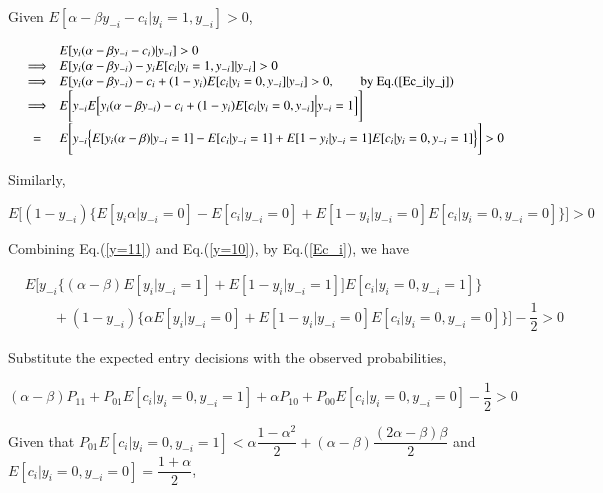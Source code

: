 \documentclass[a4paper]{article}
\begin{document}
Given $E[\alpha - \beta y_{-i} - c_i|y_i = 1, y_{-i}] > 0$, 

\begin{equation}
    \begin{array}{rcl}
        &&     E[y_i(\alpha - \beta y_{-i} - c_i)|y_{-i}] > 0 \\
        & \Longrightarrow & E[y_i(\alpha - \beta y_{-i}) - y_iE[c_i|y_i = 1, y_{-i}]|y_{-i}] > 0 \\
        & \Longrightarrow & E[y_i(\alpha - \beta y_{-i}) - c_i + (1 - y_i)E[c_i|y_i = 0, y_{-i}]|y_{-i}] > 0, \qquad \mbox{by Eq.(\ref{Ec_i|y_j})}\\
        & \Longrightarrow & E\Bigg[y_{-i}E\Big[y_i(\alpha - \beta y_{-i}) - c_i + (1 - y_i)E[c_i|y_i = 0, y_{-i}]\Big|y_{-i} = 1\Big]\Bigg] \\
        & = & E\Bigg[y_{-i}\Big\{E[y_i(\alpha - \beta)|y_{-i} = 1] - E[c_i|y_{-i} = 1] + E[1 - y_i|y_{-i} = 1]E[c_i|y_i = 0, y_{-i} = 1]\Big\}\Bigg] > 0
\end{array}
\label{y=11}
\end{equation}


Similarly,

\begin{equation}
E\Bigg[(1 - y_{-i})\Big\{E[y_i\alpha|y_{-i} = 0] - E[c_i|y_{-i} = 0] + E[1 - y_i|y_{-i} = 0]E[c_i|y_i = 0, y_{-i} = 0]\Big\}\Bigg] > 0
\label{y=10}
\end{equation}


Combining Eq.(\ref{y=11}) and Eq.(\ref{y=10}), by Eq.(\ref{Ec_i}), we have

\begin{equation}
\begin{array}{rl}
    & E\Bigg[y_{-i}\Big\{(\alpha - \beta)E[y_i|y_{-i} = 1] + E[1 - y_i|y_{-i} = 1]]E[c_i|y_i = 0, y_{-i} = 1] \Big\}   \\
    & \qquad + (1 - y_{-i})\Big\{\alpha E[y_i|y_{-i} = 0] + E[1 - y_i|y_{-i} = 0]E[c_i|y_i = 0, y_{-i} = 0]\Big\}\Bigg] - \dfrac{1}{2}> 0 
\end{array}
\end{equation}

Substitute the expected entry decisions with the observed probabilities, 

\begin{equation}
    (\alpha - \beta)P_{11} + P_{01}E[c_i|y_i = 0, y_{-i} = 1] + \alpha P_{10} + P_{00}E[c_i|y_i = 0, y_{-i} = 0] - \dfrac{1}{2} > 0
\end{equation}

Given that $P_{01}E[c_i|y_i = 0, y_{-i} = 1] < \alpha\dfrac{1 - \alpha^2}{2} + (\alpha- \beta)\dfrac{(2\alpha - \beta)\beta}{2}$ and $E[c_i|y_i = 0, y_{-i} = 0] = \dfrac{1 + \alpha}{2}$,
\end{document}
